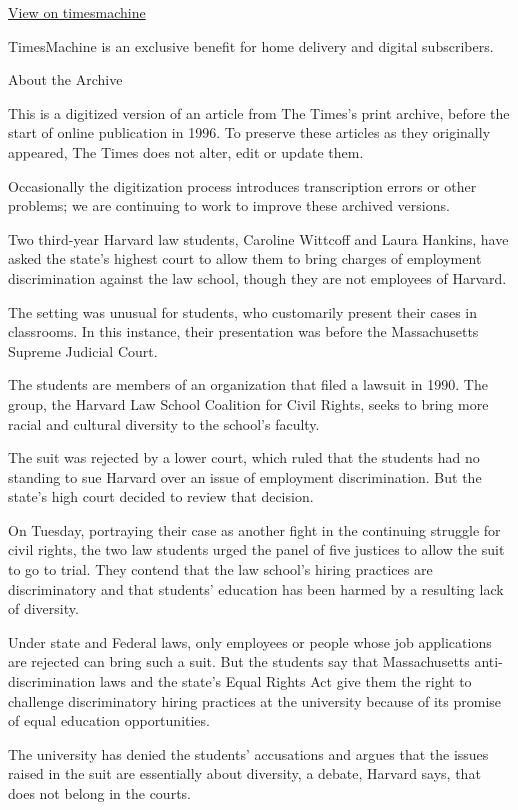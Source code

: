 \href{http://timesmachine.nytimes.com/timesmachine/1992/03/06/004692.html}{View
on timesmachine}

TimesMachine is an exclusive benefit for home delivery and digital
subscribers.

About the Archive

This is a digitized version of an article from The Times's print
archive, before the start of online publication in 1996. To preserve
these articles as they originally appeared, The Times does not alter,
edit or update them.

Occasionally the digitization process introduces transcription errors or
other problems; we are continuing to work to improve these archived
versions.

Two third-year Harvard law students, Caroline Wittcoff and Laura
Hankins, have asked the state's highest court to allow them to bring
charges of employment discrimination against the law school, though they
are not employees of Harvard.

The setting was unusual for students, who customarily present their
cases in classrooms. In this instance, their presentation was before the
Massachusetts Supreme Judicial Court.

The students are members of an organization that filed a lawsuit in
1990. The group, the Harvard Law School Coalition for Civil Rights,
seeks to bring more racial and cultural diversity to the school's
faculty.

The suit was rejected by a lower court, which ruled that the students
had no standing to sue Harvard over an issue of employment
discrimination. But the state's high court decided to review that
decision.

On Tuesday, portraying their case as another fight in the continuing
struggle for civil rights, the two law students urged the panel of five
justices to allow the suit to go to trial. They contend that the law
school's hiring practices are discriminatory and that students'
education has been harmed by a resulting lack of diversity.

Under state and Federal laws, only employees or people whose job
applications are rejected can bring such a suit. But the students say
that Massachusetts anti-discrimination laws and the state's Equal Rights
Act give them the right to challenge discriminatory hiring practices at
the university because of its promise of equal education opportunities.

The university has denied the students' accusations and argues that the
issues raised in the suit are essentially about diversity, a debate,
Harvard says, that does not belong in the courts.

